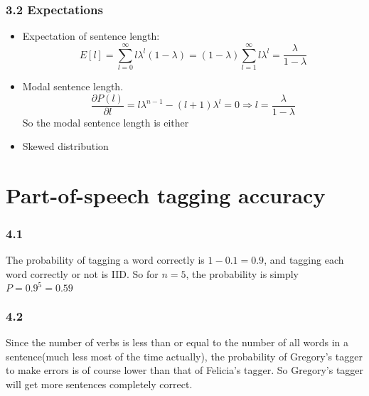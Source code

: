 \documentclass[twoside,10pt]{article}
\begin{document}
\subsubsection*{3.2 Expectations}
\begin{itemize}
  \item Expectation of sentence length:
    \begin{equation}
      E[l] = \sum_{l=0}^{\infty}l\lambda^l(1-\lambda) =
    (1-\lambda)\sum_{l=1}^{\infty}l\lambda^l = \frac{\lambda}{1-\lambda} 
  \end{equation}
  \item Modal sentence length.
    \begin{equation}
      \frac{\partial P(l)}{\partial l} = l\lambda^{n-1}-(l+1)\lambda^l =
      0\Rightarrow l = \frac{\lambda}{1-\lambda}
    \end{equation}
    So the modal sentence length is either 
  \item Skewed distribution
\end{itemize}

\section{Part-of-speech tagging accuracy}

\subsubsection*{4.1} The probability of tagging a word correctly is $1 - 0.1 =
0.9$, and tagging each word correctly or not is IID. So for $n = 5$, the
probability is simply $P = 0.9^5 = 0.59$

\subsubsection*{4.2} Since the number of verbs is less than or equal to the
number of all words in a sentence(much less most of the time actually), the
probability of Gregory's tagger to make errors is of course lower than that of 
Felicia's tagger. So Gregory's tagger will get more sentences completely
correct.
\end{document}
